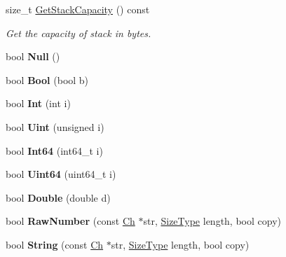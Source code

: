 \begin{DoxyCompactItemize}
\mbox{\label{a01996_a9e2e543c326b8b981d4f2c3d6793d15b}} 
size\+\_\+t \hyperlink{a01996_a9e2e543c326b8b981d4f2c3d6793d15b}{Get\+Stack\+Capacity} () const
\begin{DoxyCompactList}\small\item\em Get the capacity of stack in bytes. \end{DoxyCompactList}\item 
\mbox{\label{a01996_a87dc7f66b2b92660b8a43546733f9df2}} 
bool {\bfseries Null} ()
\item 
\mbox{\label{a01996_a4c44780642518dd34bd241a1ea0ceaf1}} 
bool {\bfseries Bool} (bool b)
\item 
\mbox{\label{a01996_a8cc986266becaa268474c607489745c7}} 
bool {\bfseries Int} (int i)
\item 
\mbox{\label{a01996_a530dd899a04a00ba74f52507b488d2c1}} 
bool {\bfseries Uint} (unsigned i)
\item 
\mbox{\label{a01996_a934b1b7a7ed89917615a5410db77a942}} 
bool {\bfseries Int64} (int64\+\_\+t i)
\item 
\mbox{\label{a01996_a50ac3451a1afd0ce248dcc023d5e09e8}} 
bool {\bfseries Uint64} (uint64\+\_\+t i)
\item 
\mbox{\label{a01996_a934bf7a5d1ff062ab079756d842e4f6b}} 
bool {\bfseries Double} (double d)
\item 
\mbox{\label{a01996_af703994dec5af6ef049a24b5243aceab}} 
bool {\bfseries Raw\+Number} (const \hyperlink{a01992_ade0e0ce64ccd5d852da57a35e720bafb}{Ch} $\ast$str, \hyperlink{a00560_a5ed6e6e67250fadbd041127e6386dcb5}{Size\+Type} length, bool copy)
\item 
\mbox{\label{a01996_ad319fcc9e13606b6795424b9374a7398}} 
bool {\bfseries String} (const \hyperlink{a01992_ade0e0ce64ccd5d852da57a35e720bafb}{Ch} $\ast$str, \hyperlink{a00560_a5ed6e6e67250fadbd041127e6386dcb5}{Size\+Type} length, bool copy)
\item 
\mbox{\label{a01996_abb1417fde52cc34cb340e3b50a3295da}} 

\end{DoxyCompactItemize}
